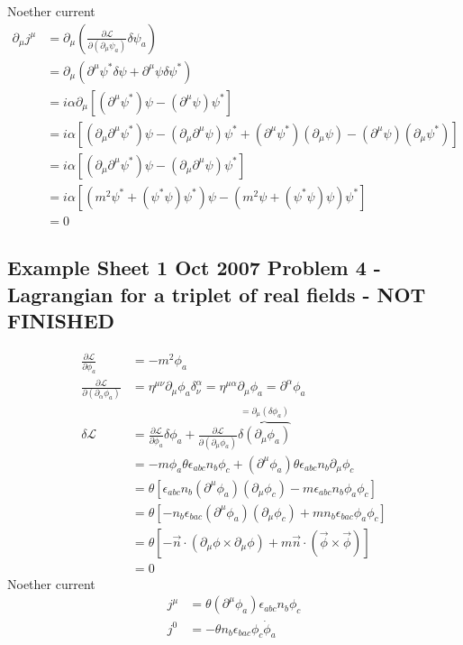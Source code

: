 \documentclass[10pt,a4paper]{book}
\theoremstyle{definition}
\begin{document}
Noether current 
\begin{align}
\partial_\mu j^\mu&=\partial_\mu\left(\frac{\partial\mathcal{L}}{\partial(\partial_\mu\psi_a)}\delta\psi_a\right)\\
&=\partial_\mu\left(\partial^\mu\psi^*\delta\psi+\partial^\mu\psi\delta\psi^*\right)\\
&=i\alpha\partial_\mu\left[(\partial^\mu\psi^*)\psi-(\partial^\mu\psi)\psi^*\right]\\
&=i\alpha\left[(\partial_\mu\partial^\mu\psi^*)\psi-(\partial_\mu\partial^\mu\psi)\psi^*+(\partial^\mu\psi^*)(\partial_\mu\psi)-(\partial^\mu\psi)(\partial_\mu\psi^*)\right]\\
&=i\alpha\left[(\partial_\mu\partial^\mu\psi^*)\psi-(\partial_\mu\partial^\mu\psi)\psi^*\right]\\
&=i\alpha\left[(m^2\psi^*+(\psi^*\psi)\psi^*)\psi-(m^2\psi+(\psi^*\psi)\psi)\psi^*\right]\\
&=0
\end{align}

\subsection{Example Sheet 1 Oct 2007 Problem 4 - Lagrangian for a triplet of real fields - NOT FINISHED}
\begin{align}
\frac{\partial \mathcal{L}}{\partial\phi_a}
&=-m^2\phi_a\\
\frac{\partial \mathcal{L}}{\partial(\partial_\alpha\phi_a)}
&=\eta^{\mu\nu}\partial_\mu\phi_a\delta^\alpha_\nu
=\eta^{\mu\alpha}\partial_\mu\phi_a
=\partial^\alpha\phi_a\\
\delta\mathcal{L}
&=\frac{\partial\mathcal{L}}{\partial\phi_a}\delta\phi_a+\frac{\partial\mathcal{L}}{\partial(\partial_\mu\phi_a)}\overbrace{\delta(\partial_\mu\phi_a)}^{=\partial_\mu(\delta\phi_a)}\\
&=-m\phi_a\theta\epsilon_{abc}n_b\phi_c+(\partial^\mu\phi_a)\theta\epsilon_{abc}n_b\partial_\mu\phi_c\\
&=\theta[\epsilon_{abc}n_b(\partial^\mu\phi_a)(\partial_\mu\phi_c)-m\epsilon_{abc}n_b\phi_a\phi_c]\\
&=\theta[-n_b\epsilon_{bac}(\partial^\mu\phi_a)(\partial_\mu\phi_c)+m n_b\epsilon_{bac}\phi_a\phi_c]\\
&=\theta[-\vec{n}\cdot(\partial_\mu\phi\times\partial_\mu\phi)+m\vec{n}\cdot(\vec{\phi}\times\vec{\phi})]\\
&=0
\end{align}
Noether current
\begin{align}
j^\mu&=\theta(\partial^\mu\phi_a)\epsilon_{abc}n_b\phi_c\\
j^0&=-\theta n_b\epsilon_{bac}\phi_c\dot{\phi}_a
\end{align}
\end{document}

